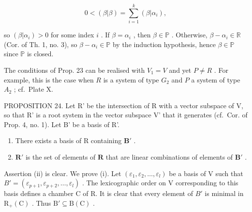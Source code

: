 \[
0 <   (\beta | \beta) = \sum_ {i = 1} ^ {k} (\beta | \alpha_ {i}),
\]

so \((\beta |\alpha_{i}) > 0\) for some index \(i\) . If \(\beta = \alpha_{i}\) , then \(\beta \in \mathbb{P}\) . Otherwise, \(\beta - \alpha_{i} \in \mathbb{R}\) (Cor. of Th. 1, no. 3), so \(\beta - \alpha_{i} \in \mathbb{P}\) by the induction hypothesis, hence \(\beta \in \mathbb{P}\) since \(\mathbb{P}\) is closed.

The conditions of Prop. 23 can be realised with \(V_{1} = V\) and yet \(P \neq R\) . For example, this is the case when \(R\) is a system of type \(G_{2}\) and \(P\) a system of type \(A_{2}\) ; cf.~Plate X.

PROPOSITION 24. Let R' be the intersection of R with a vector subspace of V, so that R' is a root system in the vector subspace V' that it generates (cf.~Cor. of Prop. 4, no. 1). Let B' be a basis of R'.

\begin{enumerate}
\def\labelenumi{(\roman{enumi})}
\item
  There exists a basis of R containing \(\mathbf{B}'\) .
\item
  \(\mathbf{R}'\) is the set of elements of \(\mathbf{R}\) that are linear combinations of elements of \(\mathbf{B}'\) .
\end{enumerate}

Assertion (ii) is clear. We prove (i). Let \((\varepsilon_{1},\varepsilon_{2},\ldots,\varepsilon_{l})\) be a basis of V such that \(B' = (\varepsilon_{p+1},\varepsilon_{p+2},\ldots,\varepsilon_{l})\) . The lexicographic order on V corresponding to this basis defines a chamber C of R. It is clear that every element of \(B'\) is minimal in \(\mathrm{R}_{+}(\mathrm{C})\) . Thus \(\mathrm{B}' \subseteq \mathrm{B}(\mathrm{C})\) .

